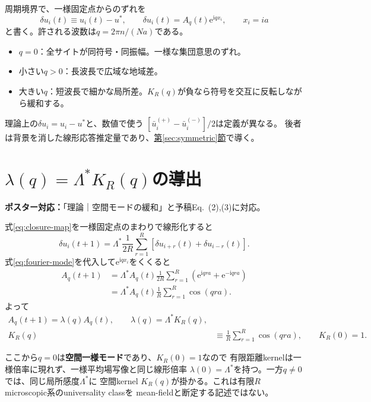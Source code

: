 \documentclass[a4paper,12pt]{ltjsarticle}
\newcommand{\PosterMap}[1]{%
  \begin{tcolorbox}[enhanced,boxrule=0pt,arc=1mm,colback=softgray,
    left=2mm,right=2mm,top=1mm,bottom=1mm,before skip=0pt,after skip=0.7em]
  \normalsize\textbf{ポスター対応：}#1
  \end{tcolorbox}}
\newcommand{\Caution}[1]{%
  \begin{tcolorbox}[enhanced,breakable,colback=softblue,colframe=navy,
    boxrule=0.6pt,arc=1.2mm,left=3mm,right=3mm,top=2mm,bottom=2mm,
    title=主張の範囲,fonttitle=\bfseries]
  #1
  \end{tcolorbox}}
\newcommand{\e}{\mathrm e}
\newcommand{\iu}{\mathrm i}
\begin{document}
周期境界で、一様固定点からのずれを
\begin{equation}
 \delta u_i(t)\equiv u_i(t)-u^*,\qquad
 \delta u_i(t)=A_q(t)\e^{\iu qx_i},\qquad x_i=ia
 \label{eq:fourier-mode}
\end{equation}
と書く。許される波数は$q=2\pi n/(Na)$である。

\begin{itemize}
 \item $q=0$：全サイトが同符号・同振幅。一様な集団意思のずれ。
 \item 小さい$q>0$：長波長で広域な地域差。
 \item 大きい$q$：短波長で細かな局所差。$K_R(q)$が負なら符号を交互に反転しながら緩和する。
\end{itemize}

\Caution{
  理論上の$\delta u_i=u_i-u^*$と、数値で使う
  $[\bar u_i^{(+)}-\bar u_i^{(-)}]/2$は定義が異なる。
  後者は背景を消した線形応答推定量であり、\hyperref[sec:symmetric]{第\ref*{sec:symmetric}節}で導く。
}

\section{\texorpdfstring{$\lambda(q)=\Lambda^*K_R(q)$}{lambda(q) = Lambda-star K-R(q)}の導出}\label{sec:lambda-kernel}
\PosterMap{「理論｜空間モードの緩和」と予稿Eq.~(2),(3)に対応。}

式\eqref{eq:closure-map}を一様固定点のまわりで線形化すると
\begin{equation}
 \delta u_i(t+1)=\Lambda^*\frac{1}{2R}\sum_{r=1}^{R}
 \left[\delta u_{i+r}(t)+\delta u_{i-r}(t)\right].
 \label{eq:spatial-linear}
\end{equation}
式\eqref{eq:fourier-mode}を代入して$\e^{\iu qx_i}$をくくると
\begin{align}
 A_q(t+1)
 &=\Lambda^*A_q(t)\frac{1}{2R}\sum_{r=1}^{R}
 \left(\e^{\iu qra}+\e^{-\iu qra}\right)\\
 &=\Lambda^*A_q(t)\frac1R\sum_{r=1}^{R}\cos(qra).
\end{align}
よって
\begin{align}
 \boxed{A_q(t+1)=\lambda(q)A_q(t)},\qquad
 \boxed{\lambda(q)=\Lambda^*K_R(q)},\label{eq:lambda-factorization}\\
 K_R(q)&\equiv\frac1R\sum_{r=1}^{R}\cos(qra),
 \qquad K_R(0)=1.\label{eq:kernel-fourier}
\end{align}

ここから$q=0$は\textbf{空間一様モード}であり、$K_R(0)=1$なので
有限距離kernelは一様倍率に現れず、一様平均場写像と同じ線形倍率
$\lambda(0)=\Lambda^*$を持つ。一方$q\neq0$では、同じ局所感度$\Lambda^*$に
空間kernel $K_R(q)$が掛かる。これは有限$R$ microscopic系のuniversality classを
mean-fieldと断定する記述ではない。
\end{document}
